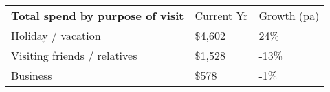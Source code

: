 \begin{tabular}[t]{p{5.1cm}>{\hfill}p{1.1cm}>{\hfill}p{1.3cm}}
 \textbf{Total spend by purpose of visit} & Current Yr & Growth (pa) \\ 
 Holiday / vacation & \$4,602 & 24\% \\ 
  Visiting friends / relatives & \$1,528 & -13\% \\ 
  Business & \$578   & -1\% \\ 
  \end{tabular}
